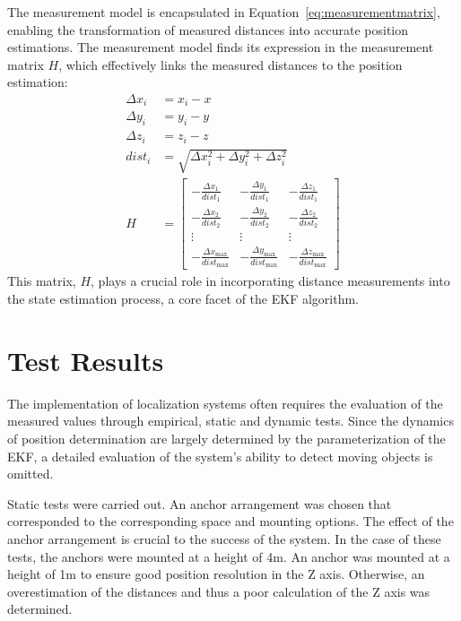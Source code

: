 \documentclass[10pt,a4paper,twocolumn]{article}
\begin{document}
The measurement model is encapsulated in Equation~\ref{eq:measurementmatrix},
enabling the transformation of measured distances into accurate position estimations.
The measurement model finds its expression in the measurement matrix $H$,
which effectively links the measured distances to the position estimation:
\begin{equation}
  \begin{aligned}
    \Delta x_i &= x_i - x \\
    \Delta y_i &= y_i - y \\
    \Delta z_i &= z_i - z \\
    dist_i &= \sqrt{{\Delta x_i^2 + \Delta y_i^2 + \Delta z_i^2}} \\
    H &= \begin{bmatrix}
    -\frac{{\Delta x_1}}{{dist_1}} & -\frac{{\Delta y_1}}{{dist_1}} & -\frac{{\Delta z_1}}{{dist_1}} \\
    -\frac{{\Delta x_2}}{{dist_2}} & -\frac{{\Delta y_2}}{{dist_2}} & -\frac{{\Delta z_2}}{{dist_2}} \\
    \vdots & \vdots & \vdots \\
    -\frac{{\Delta x_{\text{max}}}}{{dist_{\text{max}}}} & -\frac{{\Delta y_{\text{max}}}}{{dist_{\text{max}}}} & -\frac{{\Delta z_{\text{max}}}}{{dist_{\text{max}}}}
    \end{bmatrix}
  \end{aligned}
  \label{eq:measurementmatrix}
\end{equation}
This matrix, $H$, plays a crucial role in incorporating distance measurements
into the state estimation process, a core facet of the \ac{EKF} algorithm.

\section{Test Results}\label{section:tests}
The implementation of localization systems often requires the evaluation of the measured values through empirical,
static and dynamic tests.
Since the dynamics of position determination are largely determined by the parameterization of the \ac{EKF},
a detailed evaluation of the system's ability to detect moving objects is omitted.

Static tests were carried out.
An anchor arrangement was chosen that corresponded to the corresponding space and mounting options.
The effect of the anchor arrangement is crucial to the success of the system.
In the case of these tests, the anchors were mounted at a height of 4m.
An anchor was mounted at a height of 1m to ensure good position resolution in the Z axis.
Otherwise, an overestimation of the distances and thus a poor calculation of the Z axis was determined.
\end{document}
